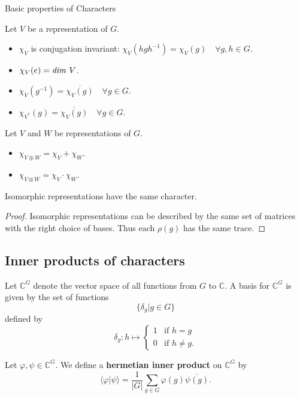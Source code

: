 \begin{frame}{Basic properties of Characters}
\begin{proposition}
Let $V$ be a representation of $G$.
\begin{itemize}
\item $\chi_V$ is conjugation invariant: $\chi_V (h g h^{-1}) = \chi_V (g) \quad \forall g , h \in G$.
\item $\chi_V (e) = \text{\emph{dim }} V$.
\item \label{char-of-inverse} $\chi_V (g^{-1}) = \overline{\chi_V (g)} \quad \forall g \in G$.
\item $\chi_{V^*} (g) =  \overline{\chi_V (g)}\quad \forall g \in G$.
\end{itemize}
\end{proposition}
\begin{proposition}
Let $V$ and $W$ be representations of $G$.
\begin{itemize}
\item $\chi _{V \oplus W} = \chi_V + \chi_W$.
\item $\chi_{V \otimes W} = \chi_V \cdot \chi_W$.
\end{itemize}
\end{proposition}
\end{frame}

\begin{frame}
\begin{proposition}
Isomorphic representations have the same character.
\end{proposition}
\begin{proof}
Isomorphic representations can be described by the same set of matrices with the right choice of bases.  Thus each $\rho(g)$ has the same trace.
\end{proof}
\end{frame}

\subsection{Inner products of characters}
\begin{frame}
\begin{definition}
Let $\mathbb{C}^G$ denote the vector space of all functions from $G$ to $\mathbb{C}$.
A basis for $\mathbb{C}^G$ is given by the set of functions 
\[\{ \delta_g | g \in G  \} \]
defined by 
\[ \delta_g \colon h \mapsto \begin{cases}  1 &\text{if } h = g \\
 0 &\text{if } h \neq g.
\end{cases} \]
\end{definition}
\begin{definition}
Let $\varphi, \psi \in \mathbb{C}^G$.  We define a \textbf{hermetian inner product}  on $\mathbb{C}^G$ by 
\[ \langle \varphi | \psi \rangle = \frac{1}{|G|} \sum_{g \in G} \varphi(g) \overline{\psi(g)}.\]
\end{definition}
\end{frame}

